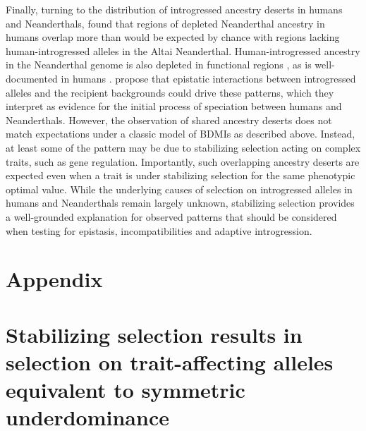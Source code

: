 \documentclass{article}
\begin{document}
Finally, turning to the distribution of introgressed ancestry deserts in humans
and Neanderthals, \citet{harris2023diverse} found that regions of depleted
Neanderthal ancestry in humans overlap more than would be expected by chance
with regions lacking human-introgressed alleles in the Altai Neanderthal.
Human-introgressed ancestry in the Neanderthal genome is also depleted in
functional regions \citep{harris2023diverse}, as is well-documented in humans
\citep{sankararaman2014genomic, sankararaman2016combined}. 
\citet{harris2023diverse} propose that epistatic interactions between
introgressed alleles and the recipient backgrounds could drive these patterns,
which they interpret as evidence for the initial process of speciation between
humans and Neanderthals. However, the observation of shared ancestry deserts
does not match expectations under a classic model of BDMIs as described above.
Instead, at least some of the pattern may be due to stabilizing selection
acting on complex traits, such as gene regulation. Importantly, such
overlapping ancestry deserts are expected even when a trait is under
stabilizing selection for the same phenotypic optimal value. While the
underlying causes of selection on introgressed alleles in humans and
Neanderthals remain largely unknown, stabilizing selection provides a
well-grounded explanation for observed patterns that should be considered when
testing for epistasis, incompatibilities and adaptive introgression.






\appendix
\section*{Appendix}

\section{Stabilizing selection results in selection on trait-affecting alleles
equivalent to symmetric underdominance} \label{sec:underdominance}
\end{document}
